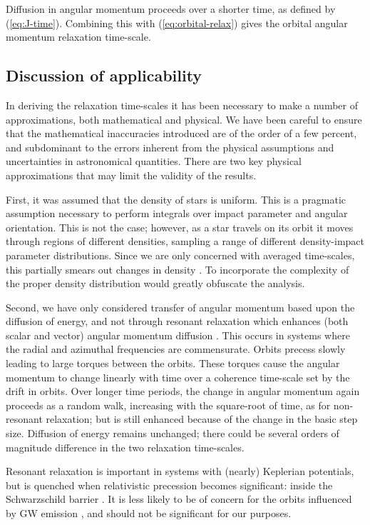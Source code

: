 \documentclass[useAMS,usedcolumn,usegraphicx,usenatbib]{mn2e}
\newcommand{\eqnref}[1]{(\ref{eq:#1})}
\begin{document}
\begin{onecolumn}
Diffusion in angular momentum proceeds over a shorter time, as defined by \eqnref{J-time}. Combining this with \eqnref{orbital-relax} gives the orbital angular momentum relaxation time-scale.

\subsection{Discussion of applicability}

In deriving the relaxation time-scales it has been necessary to make a number of approximations, both mathematical and physical. We have been careful to ensure that the mathematical inaccuracies introduced are of the order of a few percent, and subdominant to the errors inherent from the physical assumptions and uncertainties in astronomical quantities. There are two key physical approximations that may limit the validity of the results.

First, it was assumed that the density of stars is uniform. This is a pragmatic assumption necessary to perform integrals over impact parameter and angular orientation. This is not the case; however, as a star travels on its orbit it moves through regions of different densities, sampling a range of different density-impact parameter distributions. Since we are only concerned with averaged time-scales, this partially smears out changes in density \citep[cf.][]{Just2011}. To incorporate the complexity of the proper density distribution would greatly obfuscate the analysis.

Second, we have only considered transfer of angular momentum based upon the diffusion of energy, and not through resonant relaxation which enhances (both scalar and vector) angular momentum diffusion \citep{Rauch1996,Rauch1998,Gurkan2007,Eilon2009,Madigan2011}. This occurs in systems where the radial and azimuthal frequencies are commensurate. Orbits precess slowly leading to large torques between the orbits. These torques cause the angular momentum to change linearly with time over a coherence time-scale set by the drift in orbits. Over longer time periods, the change in angular momentum again proceeds as a random walk, increasing with the square-root of time, as for non-resonant relaxation; but is still enhanced because of the change in the basic step size. Diffusion of energy remains unchanged; there could be several orders of magnitude difference in the two relaxation time-scales.

Resonant relaxation is important in systems with (nearly) Keplerian potentials, but is quenched when relativistic precession becomes significant: inside the Schwarzschild barrier \citep{Merritt2011}. It is less likely to be of concern for the orbits influenced by GW emission \citep{Sigurdsson1997}, and should not be significant for our purposes.


\end{onecolumn}
\end{document}
